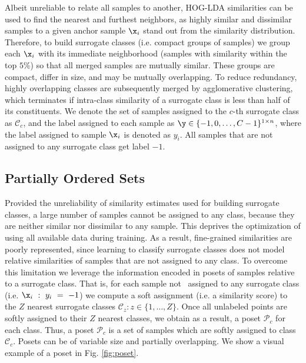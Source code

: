 \documentclass[10pt,twocolumn,letterpaper]{article}
\begin{document}
Albeit unreliable to relate all samples to another, HOG-LDA similarities can be used to find the nearest and furthest neighbors, as highly similar and dissimilar samples to a given anchor sample $\x_i$ stand out from the similarity distribution. Therefore, to build surrogate classes (i.e. compact groups of samples) we group each $\x_i$ with its immediate neighborhood (samples with similarity within the top $5\%$)
so that all merged samples are mutually similar. These groups are compact, differ in size, and may be mutually overlapping. To reduce redundancy, highly overlapping classes are subsequently merged by agglomerative clustering, which terminates if intra-class similarity of a surrogate class is less than half of its constituents. We denote the set of samples assigned to the $c$-th surrogate class as $\mathcal{C}_c$, and the label assigned to each sample as $\y \in \{-1, 0,\dots, C-1\}^{1 \times n}$, where the label assigned to sample $\x_i$ is denoted as $y_i$. All samples that are not assigned to any surrogate class get label $-1$.



\subsection{Partially Ordered Sets}

Provided the unreliability of similarity estimates used for building surrogate classes, a large number of samples cannot be assigned to any class, because they are neither similar nor dissimilar to any sample. This deprives the optimization of using all available data during training. As a result, fine-grained similarities are poorly represented, since learning to classify surrogate classes does not model relative similarities of samples that are not assigned to any class. To overcome this limitation we leverage the information encoded in posets of samples relative to a surrogate class. That is, for each sample not ~assigned to any surrogate class (i.e. $\x_i~:~y_i~=~-1$) we compute a soft assignment (i.e. a similarity score) to the $Z$ nearest surrogate classes $\mathcal{C}_z : z \in \{1, \dots, Z\}$. Once all unlabeled points are softly assigned to their $Z$ nearest classes, we obtain as a result, a poset $\mathcal{P}_c$ for each class. Thus, a poset $\mathcal{P}_c$ is a set of samples which are softly assigned to class $\mathcal{C}_c$. Posets can be of variable size and partially overlapping. We show a visual example of a poset in Fig. \ref{fig:poset}.
\end{document}
